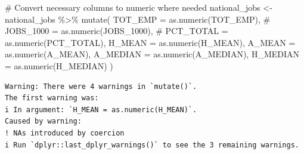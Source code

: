 \documentclass[
  letterpaper,
  DIV=11,
  numbers=noendperiod]{scrartcl}
\newenvironment{Shaded}{\begin{snugshade}}{\end{snugshade}}
\newcommand{\AttributeTok}[1]{\textcolor[rgb]{0.40,0.45,0.13}{#1}}
\newcommand{\CommentTok}[1]{\textcolor[rgb]{0.37,0.37,0.37}{#1}}
\newcommand{\FunctionTok}[1]{\textcolor[rgb]{0.28,0.35,0.67}{#1}}
\newcommand{\NormalTok}[1]{\textcolor[rgb]{0.00,0.23,0.31}{#1}}
\newcommand{\OtherTok}[1]{\textcolor[rgb]{0.00,0.23,0.31}{#1}}
\newcommand{\SpecialCharTok}[1]{\textcolor[rgb]{0.37,0.37,0.37}{#1}}
\begin{document}
\begin{Shaded}
\begin{Highlighting}[]
\CommentTok{\# Convert necessary columns to numeric where needed}
\NormalTok{national\_jobs }\OtherTok{\textless{}{-}}\NormalTok{ national\_jobs }\SpecialCharTok{\%\textgreater{}\%}
  \FunctionTok{mutate}\NormalTok{(}
    \AttributeTok{TOT\_EMP =} \FunctionTok{as.numeric}\NormalTok{(TOT\_EMP),}
    \CommentTok{\# JOBS\_1000 = as.numeric(JOBS\_1000),}
    \CommentTok{\# PCT\_TOTAL = as.numeric(PCT\_TOTAL),}
    \AttributeTok{H\_MEAN =} \FunctionTok{as.numeric}\NormalTok{(H\_MEAN),}
    \AttributeTok{A\_MEAN =} \FunctionTok{as.numeric}\NormalTok{(A\_MEAN),}
    \AttributeTok{A\_MEDIAN =} \FunctionTok{as.numeric}\NormalTok{(A\_MEDIAN),}
    \AttributeTok{H\_MEDIAN =} \FunctionTok{as.numeric}\NormalTok{(H\_MEDIAN)}
\NormalTok{  )}
\end{Highlighting}
\end{Shaded}

\begin{verbatim}
Warning: There were 4 warnings in `mutate()`.
The first warning was:
i In argument: `H_MEAN = as.numeric(H_MEAN)`.
Caused by warning:
! NAs introduced by coercion
i Run `dplyr::last_dplyr_warnings()` to see the 3 remaining warnings.
\end{verbatim}
\end{document}
